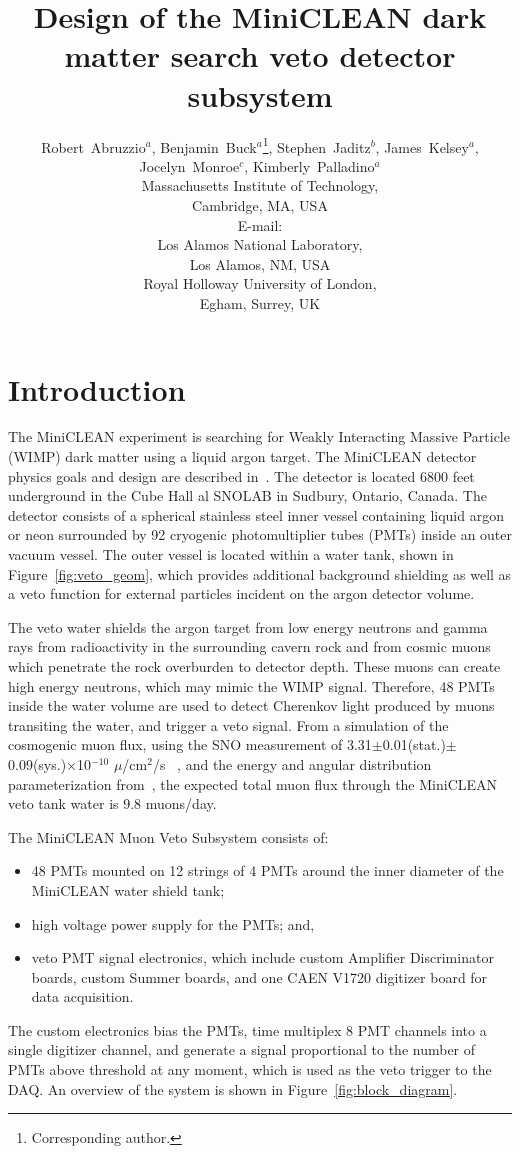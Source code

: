 \documentclass{JINST}
\title{Design of the MiniCLEAN dark matter search veto detector subsystem}
\author{Robert~Abruzzio$^a$, Benjamin~Buck$^a$\thanks{Corresponding author.}, Stephen~Jaditz$^b$, James~Kelsey$^a$, Jocelyn~Monroe$^c$, Kimberly~Palladino$^a$\\
\llap{$^a$}Massachusetts Institute of Technology,\\
	Cambridge, MA, USA\\
	E-mail: \email{bbuck@mit.edu}\\
\llap{$^b$}Los Alamos National Laboratory,\\
	Los Alamos, NM, USA\\
\llap{$^c$}Royal Holloway University of London,\\
	Egham, Surrey, UK}
\begin{document}
\section{Introduction}
\label{Introduction}
The MiniCLEAN experiment is searching for Weakly Interacting Massive Particle
(WIMP) dark matter using a liquid argon target.  The MiniCLEAN detector
physics goals and design are described in~\cite{ref:miniclean_physics}.  The
detector is located 6800 feet underground in the Cube Hall al SNOLAB in
Sudbury, Ontario, Canada.  The detector consists of a spherical stainless
steel inner vessel containing liquid argon or neon surrounded by 92 cryogenic
photomultiplier tubes (PMTs) inside an outer vacuum vessel. The outer vessel
is located within a water tank, shown in Figure~\ref{fig:veto_geom}, which
provides additional background shielding as well as a veto function for
external particles incident on the argon detector volume.  

The veto water shields the argon target from low energy neutrons and gamma
rays from radioactivity in the surrounding cavern rock and from cosmic muons
which penetrate the rock overburden to detector depth.  These muons can
create high energy neutrons, which may mimic the WIMP signal.  Therefore, 48
PMTs inside the water volume are used to detect Cherenkov light produced by
muons transiting the water, and trigger a veto signal.  From a simulation of
the cosmogenic muon flux, using the SNO measurement of
3.31$\pm$0.01(stat.)$\pm$0.09(sys.)$\times$10$^{-10}$ $\mu$/cm$^2$/s
~\cite{ref:sno_muon_flux}, and the energy and angular distribution
parameterization from~\cite{ref:mei_and_hime}, the expected total muon flux
through the MiniCLEAN veto tank water is 9.8 muons/day.  

The MiniCLEAN Muon Veto Subsystem consists of:
\begin{itemize}
\item 48 PMTs mounted on 12 strings of 4 PMTs around the inner diameter of the MiniCLEAN water shield tank;
\item high voltage power supply for the PMTs; and,
\item veto PMT signal electronics, which include custom Amplifier Discriminator boards, custom Summer boards, and one CAEN V1720 digitizer board for data acquisition.
\end{itemize}
The custom electronics bias the PMTs, time multiplex 8 PMT channels into a
single digitizer channel, and generate a signal proportional to the number
of PMTs above threshold at any moment, which is used as the veto trigger to
the DAQ.  An overview of the system is shown in
Figure~\ref{fig:block_diagram}.
\end{document}
